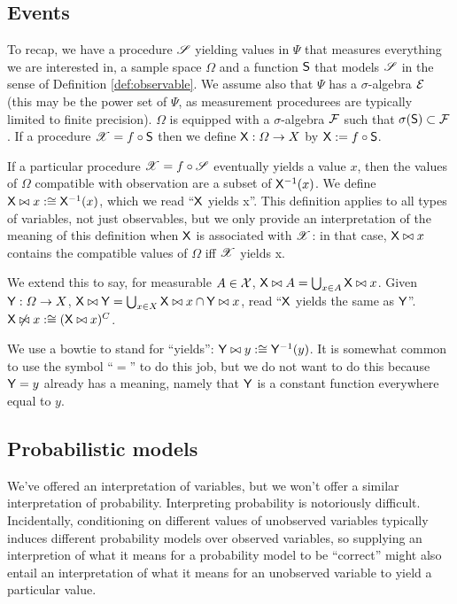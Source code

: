 \subsection{Events}

To recap, we have a procedure $\mathscr{S}$ yielding values in $\Psi$ that measures everything we are interested in, a sample space $\Omega$ and a function $\mathsf{S}$ that models $\mathscr{S}$ in the sense of Definition \ref{def:observable}. We assume also that $\Psi$ has a $\sigma$-algebra $\mathcal{E}$ (this may be the power set of $\Psi$, as measurement procedurees are typically limited to finite precision). $\Omega$ is equipped with a $\sigma$-algebra $\mathcal{F}$ such that $\sigma(\mathsf{S})\subset \mathcal{F}$. If a procedure $\mathscr{X}=f\circ \mathsf{S}$ then we define $\mathsf{X}:\Omega\to X$ by $\mathsf{X}:=f\circ\mathsf{S}$.

If a particular procedure $\mathscr{X}=f\circ \mathscr{S}$ eventually yields a value $x$, then the values of $\Omega$ compatible with observation are a subset of $\mathsf{X}^{-1}(x)$. We define $\mathsf{X}\bowtie x:\cong \mathsf{X}^{-1}(x)$, which we read ``$\mathsf{X}$ yields x''. This definition applies to all types of variables, not just observables, but we only provide an interpretation of the meaning of this definition when $\mathsf{X}$ is associated with $\mathscr{X}$: in that case, $\mathsf{X}\bowtie x$ contains the compatible values of $\Omega$ iff $\mathscr{X}$ yields x. 

We extend this to say, for measurable $A\in \mathcal{X}$, $\mathsf{X}\bowtie A=\bigcup_{x\in A} \mathsf{X}\bowtie x$. Given $\mathsf{Y}:\Omega\to X$, $\mathsf{X}\bowtie \mathsf{Y}=\bigcup_{x\in X} \mathsf{X}\bowtie x \cap \mathsf{Y}\bowtie x$, read ``$\mathsf{X}$ yields the same as $\mathsf{Y}$''. $\mathsf{X}\not\bowtie x:\cong (\mathsf{X}\bowtie x)^C$.

We use a bowtie to stand for ``yields'': $\mathsf{Y}\bowtie y :\cong \mathsf{Y}^{-1}(y)$. It is somewhat common to use the symbol ``$=$'' to do this job, but we do not want to do this because $\mathsf{Y}=y$ already has a meaning, namely that $\mathsf{Y}$ is a constant function everywhere equal to $y$. 

\subsection{Probabilistic models}

We've offered an interpretation of variables, but we won't offer a similar interpretation of probability. Interpreting probability is notoriously difficult. Incidentally, conditioning on different values of unobserved variables typically induces different probability models over observed variables, so supplying an interpretion of what it means for a probability model to be ``correct'' might also entail an interpretation of what it means for an unobserved variable to yield a particular value.

